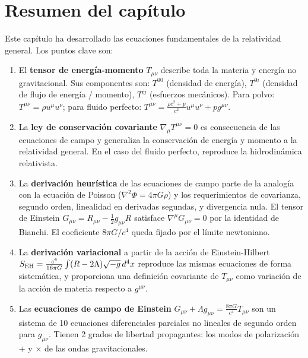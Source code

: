 \section{Resumen del capítulo}
\label{sec:resumen_cap6}

Este capítulo ha desarrollado las ecuaciones fundamentales de la relatividad general. Los puntos clave son:

\begin{enumerate}[leftmargin=2em, label=\textbf{\arabic*.}]

  \item El \textbf{tensor de energía-momento} $T_{\mu\nu}$ describe toda la materia y energía no gravitacional. Sus componentes son: $T^{00}$ (densidad de energía), $T^{0i}$ (densidad de flujo de energía / momento), $T^{ij}$ (esfuerzos mecánicos). Para polvo: $T^{\mu\nu} = \rho u^\mu u^\nu$; para fluido perfecto: $T^{\mu\nu} = \frac{\rho c^2+p}{c^2}u^\mu u^\nu + p g^{\mu\nu}$.

  \item La \textbf{ley de conservación covariante} $\nabla_\mu T^{\mu\nu} = 0$ es consecuencia de las ecuaciones de campo y generaliza la conservación de energía y momento a la relatividad general. En el caso del fluido perfecto, reproduce la hidrodinámica relativista.

  \item La \textbf{derivación heurística} de las ecuaciones de campo parte de la analogía con la ecuación de Poisson ($\nabla^2\Phi = 4\pi G\rho$) y los requerimientos de covarianza, segundo orden, linealidad en derivadas segundas, y divergencia nula. El tensor de Einstein $G_{\mu\nu} = R_{\mu\nu} - \frac{1}{2}g_{\mu\nu}R$ satisface $\nabla^\mu G_{\mu\nu} = 0$ por la identidad de Bianchi. El coeficiente $8\pi G/c^4$ queda fijado por el límite newtoniano.

  \item La \textbf{derivación variacional} a partir de la acción de Einstein-Hilbert $S_{\rm EH} = \frac{c^4}{16\pi G}\int(R-2\Lambda)\sqrt{-g}\,d^4x$ reproduce las mismas ecuaciones de forma sistemática, y proporciona una definición covariante de $T_{\mu\nu}$ como variación de la acción de materia respecto a $g^{\mu\nu}$.

  \item Las \textbf{ecuaciones de campo de Einstein} $G_{\mu\nu} + \Lambda g_{\mu\nu} = \frac{8\pi G}{c^4}T_{\mu\nu}$ son un sistema de 10 ecuaciones diferenciales parciales no lineales de segundo orden para $g_{\mu\nu}$. Tienen 2 grados de libertad propagantes: los modos de polarización $+$ y $\times$ de las ondas gravitacionales.


\end{enumerate}

